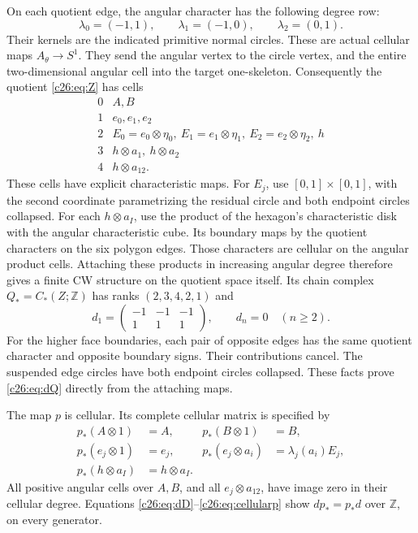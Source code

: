 On each quotient edge, the angular character has the following degree row:
\begin{equation}\label{c26:eq:characters}
\lambda_0=(-1,1),\qquad \lambda_1=(-1,0),\qquad \lambda_2=(0,1).
\end{equation}
Their kernels are the indicated primitive normal circles.
These are actual cellular maps $A_\theta\to S^1$.
They send the angular vertex to the circle vertex, and the entire
two-dimensional angular cell into the target one-skeleton.
Consequently the quotient \eqref{c26:eq:Z} has cells
\[
\begin{array}{c|l}
0&A,B\\
1&e_0,e_1,e_2\\
2&E_0=e_0\otimes\eta_0,\ E_1=e_1\otimes\eta_1,\ E_2=e_2\otimes\eta_2,\ h\\
3&h\otimes a_1,\ h\otimes a_2\\
4&h\otimes a_{12}.
\end{array}
\]
These cells have explicit characteristic maps.
For $E_j$, use $[0,1]\times[0,1]$, with the second coordinate
parametrizing the residual circle and both endpoint circles collapsed.
For each $h\otimes a_I$, use the product of the hexagon's characteristic
disk with the angular characteristic cube.
Its boundary maps by the quotient characters on the six polygon edges.
Those characters are cellular on the angular product cells.
Attaching these products in increasing angular degree therefore gives
a finite CW structure on the quotient space itself.
Its chain complex $Q_*=C_*(Z;\mathbb Z)$ has ranks $(2,3,4,2,1)$ and
\begin{equation}\label{c26:eq:dQ}
d_1=\begin{pmatrix}-1&-1&-1\\1&1&1\end{pmatrix},\qquad d_n=0\quad(n\ge2).
\end{equation}
For the higher face boundaries, each pair of opposite edges has the same
quotient character and opposite boundary signs. Their contributions cancel.
The suspended edge circles have both endpoint circles collapsed.
These facts prove \eqref{c26:eq:dQ} directly from the attaching maps.

The map $p$ is cellular. Its complete cellular matrix is specified by
\begin{equation}\label{c26:eq:cellularp}
\begin{aligned}
p_*(A\otimes1)&=A,&p_*(B\otimes1)&=B,\\
p_*(e_j\otimes1)&=e_j,&
p_*(e_j\otimes a_i)&=\lambda_j(a_i)E_j,\\
p_*(h\otimes a_I)&=h\otimes a_I.&&
\end{aligned}
\end{equation}
All positive angular cells over $A,B$, and all $e_j\otimes a_{12}$,
have image zero in their cellular degree.
Equations \eqref{c26:eq:dD}--\eqref{c26:eq:cellularp} show $dp_*=p_*d$
over $\mathbb Z$, on every generator.

